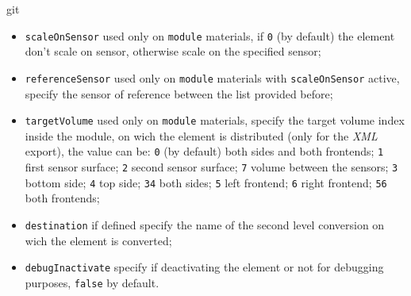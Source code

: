 git\documentclass[12pt, a4paper]{article}
\newcommand{\prop}[1]{\texttt{#1}}
\begin{document}
\begin{itemize}
\begin{itemize}
\begin{itemize}
    \item \prop{scaleOnSensor} used only on \prop{module} materials, if \prop{0} (by default) the element don't scale on sensor, otherwise scale on the specified sensor;
    \item \prop{referenceSensor} used only on \prop{module} materials with \prop{scaleOnSensor} active, specify the sensor of reference between the list provided before;
    \item \prop{targetVolume} used only on \prop{module} materials,
      specify the target volume index inside the module, on wich the
      element is distributed (only for the \emph{XML} export), the value can
      be: \prop{0} (by default) both sides and both frontends;
      \prop{1} first sensor surface; \prop{2} second sensor surface;
      \prop{7} volume between the sensors; \prop{3} bottom side;
      \prop{4} top side; \prop{34} both sides; \prop{5} left frontend;
      \prop{6} right frontend; \prop{56} both frontends;
    \item \prop{destination} if defined specify the name of the second
      level conversion on wich the element is converted;
    \item \prop{debugInactivate} specify if deactivating the element
      or not for debugging purposes, \prop{false} by default.
    \end{itemize}
  \end{itemize}
\end{itemize}
\end{document}
